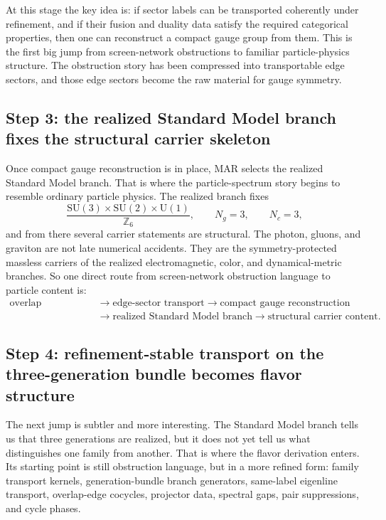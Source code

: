 \documentclass[11pt]{article}
\newcommand{\SU}{\mathrm{SU}}
\newcommand{\U}{\mathrm{U}}
\begin{document}
At this stage the key idea is: if sector labels can be transported coherently under refinement,
and if their fusion and duality data satisfy the required categorical properties, then one can
reconstruct a compact gauge group from them. This is the first big jump from screen-network
obstructions to familiar particle-physics structure. The obstruction story has been compressed
into transportable edge sectors, and those edge sectors become the raw material for gauge
symmetry.

\subsection{Step 3: the realized Standard Model branch fixes the structural carrier skeleton}

Once compact gauge reconstruction is in place, MAR selects the realized Standard Model branch.
That is where the particle-spectrum story begins to resemble ordinary particle physics. The
realized branch fixes
\[
\frac{\SU(3)\times\SU(2)\times\U(1)}{\mathbb Z_6},
\qquad
N_g=3,
\qquad
N_c=3,
\]
and from there several carrier statements are structural. The photon, gluons, and
graviton are not late numerical accidents. They are the symmetry-protected massless carriers of
the realized electromagnetic, color, and dynamical-metric branches. So one direct route from
screen-network obstruction language to particle content is:
\[
\begin{aligned}
\text{overlap obstruction}
&\to \text{edge-sector transport}
\to \text{compact gauge reconstruction} \\
&\to \text{realized Standard Model branch}
\to \text{structural carrier content}.
\end{aligned}
\]

\subsection{Step 4: refinement-stable transport on the three-generation bundle becomes flavor structure}

The next jump is subtler and more interesting. The Standard Model branch tells us that three
generations are realized, but it does not yet tell us what distinguishes one family from another.
That is where the flavor derivation enters. Its starting point is still obstruction
language, but in a more refined form: family transport kernels, generation-bundle branch
generators, same-label eigenline transport, overlap-edge cocycles, projector data, spectral
gaps, pair suppressions, and cycle phases.
\end{document}

